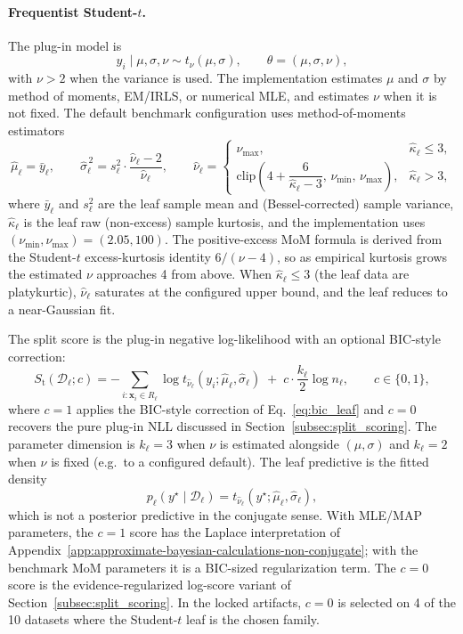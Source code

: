 \documentclass[10pt]{article} %
\begin{document}
\paragraph{Frequentist Student-$t$.}
The plug-in model is
\[
y_i \mid \mu,\sigma,\nu \sim t_\nu(\mu,\sigma),
\qquad
\theta=(\mu,\sigma,\nu),
\]
with $\nu>2$ when the variance is used. The implementation estimates $\mu$ and $\sigma$ by method of moments, EM/IRLS, or numerical MLE, and estimates $\nu$ when it is not fixed. The default benchmark configuration uses method-of-moments estimators
\begin{equation}\label{eq:student_t_mom}
\hat\mu_\ell = \bar y_\ell,
\qquad
\hat\sigma_\ell^{\,2}
= s_\ell^2 \cdot \frac{\hat\nu_\ell - 2}{\hat\nu_\ell},
\qquad
\hat\nu_\ell =
\begin{cases}
\nu_{\max}, & \hat\kappa_\ell \le 3,\\[2pt]
\mathrm{clip}\!\left(4 + \dfrac{6}{\hat\kappa_\ell - 3},\,\nu_{\min},\,\nu_{\max}\right), & \hat\kappa_\ell > 3,
\end{cases}
\end{equation}
where $\bar y_\ell$ and $s_\ell^2$ are the leaf sample mean and (Bessel-corrected) sample variance, $\hat\kappa_\ell$ is the leaf raw (non-excess) sample kurtosis, and the implementation uses $(\nu_{\min},\nu_{\max})=(2.05,100)$. The positive-excess MoM formula is derived from the Student-$t$ excess-kurtosis identity $6/(\nu-4)$, so as empirical kurtosis grows the estimated $\nu$ approaches 4 from above. When $\hat\kappa_\ell \le 3$ (the leaf data are platykurtic), $\hat\nu_\ell$ saturates at the configured upper bound, and the leaf reduces to a near-Gaussian fit.

The split score is the plug-in negative log-likelihood with an optional BIC-style correction:
\begin{equation}\label{eq:student_t_score}
S_{\mathrm{t}}(\mathcal{D}_\ell;c)
=
-\sum_{i:\mathbf{x}_i\in R_\ell}
\log t_{\hat\nu_\ell}(y_i;\hat\mu_\ell,\hat\sigma_\ell)
\;+\;
c\cdot\frac{k_\ell}{2}\log n_\ell,
\qquad
c\in\{0,1\},
\end{equation}
where $c=1$ applies the BIC-style correction of Eq.~\eqref{eq:bic_leaf} and $c=0$ recovers the pure plug-in NLL discussed in Section~\ref{subsec:split_scoring}. The parameter dimension is $k_\ell=3$ when $\nu$ is estimated alongside $(\mu,\sigma)$ and $k_\ell=2$ when $\nu$ is fixed (e.g.\ to a configured default). The leaf predictive is the fitted density
\[
p_\ell(y^\star\mid\mathcal{D}_\ell)
=
t_{\hat\nu_\ell}(y^\star;\hat\mu_\ell,\hat\sigma_\ell),
\]
which is not a posterior predictive in the conjugate sense. With MLE/MAP parameters, the $c=1$ score has the Laplace interpretation of Appendix~\ref{app:approximate-bayesian-calculations-non-conjugate}; with the benchmark MoM parameters it is a BIC-sized regularization term. The $c=0$ score is the evidence-regularized log-score variant of Section~\ref{subsec:split_scoring}. In the locked artifacts, $c=0$ is selected on 4 of the 10 datasets where the Student-$t$ leaf is the chosen family.
\end{document}
